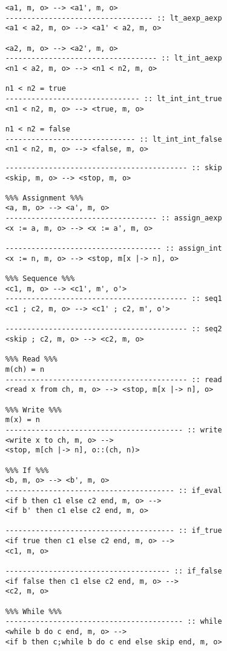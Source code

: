\documentclass[conference]{IEEEtran}
\begin{document}
\begin{lstlisting}[label=listing:input-semantics-booleans,captionpos=b,caption=Ott small-step semantics of boolean expressions]
	%%% Lower Than %%%
	<a1, m, o> --> <a1', m, o>
	---------------------------------- :: lt_aexp_aexp
	<a1 < a2, m, o> --> <a1' < a2, m, o>
	
	<a2, m, o> --> <a2', m, o>
	----------------------------------- :: lt_int_aexp
	<n1 < a2, m, o> --> <n1 < n2, m, o>
	
	n1 < n2 = true
	------------------------------- :: lt_int_int_true
	<n1 < n2, m, o> --> <true, m, o>
	
	n1 < n2 = false
	------------------------------ :: lt_int_int_false
	<n1 < n2, m, o> --> <false, m, o>
\end{lstlisting}

\begin{lstlisting}[label=listing:input-semantics-commands,captionpos=b,caption=Ott small-step semantics of commands]
	%%% Skip %%%
	------------------------------------------ :: skip
	<skip, m, o> --> <stop, m, o>

	%%% Assignment %%%
	<a, m, o> --> <a', m, o>
	----------------------------------- :: assign_aexp
	<x := a, m, o> --> <x := a', m, o>
	
	------------------------------------ :: assign_int
	<x := n, m, o> --> <stop, m[x |-> n], o>
	
	%%% Sequence %%%
	<c1, m, o> --> <c1', m', o'>
	------------------------------------------ :: seq1
	<c1 ; c2, m, o> --> <c1' ; c2, m', o'>
	
	------------------------------------------ :: seq2
	<skip ; c2, m, o> --> <c2, m, o>
	
	%%% Read %%%
	m(ch) = n
	------------------------------------------ :: read
	<read x from ch, m, o> --> <stop, m[x |-> n], o>
	
	%%% Write %%%
	m(x) = n
	----------------------------------------- :: write
	<write x to ch, m, o> --> 
	<stop, m[ch |-> n], o::(ch, n)>
	
	%%% If %%%
	<b, m, o> --> <b', m, o>
	--------------------------------------- :: if_eval
	<if b then c1 else c2 end, m, o> --> 
	<if b' then c1 else c2 end, m, o>
	
	--------------------------------------- :: if_true
	<if true then c1 else c2 end, m, o> --> 
	<c1, m, o>
	
	-------------------------------------- :: if_false
	<if false then c1 else c2 end, m, o> --> 
	<c2, m, o>
	
	%%% While %%%
	----------------------------------------- :: while
	<while b do c end, m, o> --> 
	<if b then c;while b do c end else skip end, m, o>
\end{lstlisting}
\end{document}
